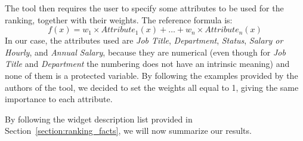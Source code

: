 The tool then requires the user to specify some attributes to be used for the ranking, together with their weights. The reference formula is: \[f(x) = w_1 \times \mathit{Attribute}_1(x) + \ldots + w_n \times \mathit{Attribute}_n(x)\]
In our case, the attributes used are \textit{Job Title}, \textit{Department}, \textit{Status}, \textit{Salary or Hourly}, and \textit{Annual Salary}, because they are numerical (even though for \textit{Job Title} and \textit{Department} the numbering does not have an intrinsic meaning) and none of them is a protected variable. By following the examples provided by the authors of the tool, we decided to set the weights all equal to 1, giving the same importance to each attribute.

By following the widget description list provided in Section~\ref{section:ranking_facts}, we will now summarize our results.
